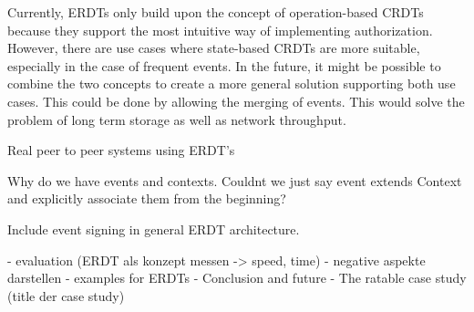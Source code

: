 \documentclass[
	english,
	ruledheaders=section,   %
	class=report,		    %
	thesis={type=bachelor}, %
	accentcolor=9c,			%
	custommargins=true,    %
	marginpar=false,        %
	parskip=half-,          %
	fontsize=11pt,          %
]{tudapub}
\begin{document}
Currently, ERDTs only build upon the concept of operation-based CRDTs because they support the most intuitive way of implementing authorization. However, there are use cases where state-based CRDTs are more suitable, especially in the case of frequent events. In the future, it might be possible to combine the two concepts to create a more general solution supporting both use cases. This could be done by allowing the merging of events. This would solve the problem of long term storage as well as network throughput. 


Real peer to peer systems using ERDT's 

Why do we have events and contexts. Couldnt we just say event extends Context and explicitly associate them from the beginning?

Include event signing in general ERDT architecture.

- evaluation (ERDT als konzept messen -> speed, time)
- negative aspekte darstellen
- examples for ERDTs
- Conclusion and future
- The ratable case study (title der case study)

\printbibliography
\end{document}
